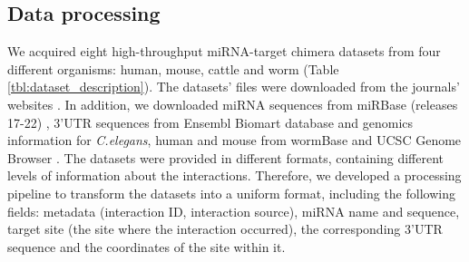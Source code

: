 \documentclass{bmcart}
\begin{document}



\subsection*{Data processing}

We acquired eight high-throughput miRNA-target chimera datasets from four different organisms: human, mouse, cattle and worm (Table \ref{tbl:dataset_description}). The datasets' files were downloaded from the journals' websites \cite{scheel2017global, grosswendt2014unambiguous, broughton2016pairing, Helwak2014, darnell_moore2015mirna}. In addition, we downloaded miRNA sequences from miRBase (releases 17-22) \cite{kozomara2013mirbase},  3'UTR sequences from Ensembl Biomart database \cite{smedley2015biomart} and genomics information for \textit{C.elegans}, human and mouse from wormBase \cite{lee2017wormbase} and UCSC Genome Browser \cite{karolchik2004ucsc}.
The datasets were provided in different formats, containing different levels of information about the interactions. Therefore, we developed a processing pipeline to transform the datasets into a uniform format, including the following fields: metadata (interaction ID, interaction source), miRNA name and sequence, target site (the site where the interaction occurred), the corresponding 3'UTR sequence and the coordinates of the site within it.
\end{document}
